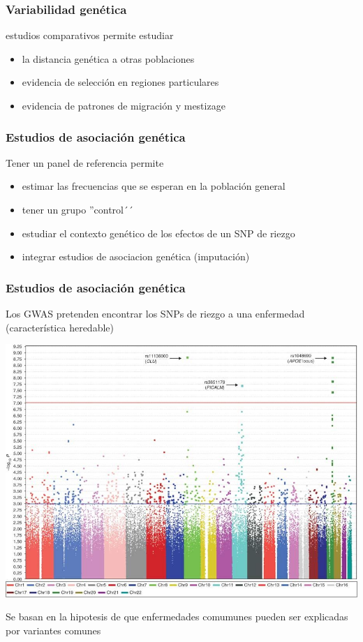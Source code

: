 \documentclass{beamer}\usepackage[]{graphicx}\usepackage[]{color}
\begin{document}
\begin{frame}[fragile]
\frametitle{Variabilidad gen\'etica}
estudios comparativos permite estudiar
\begin{itemize}
\item la distancia gen\'etica a otras poblaciones 
\item evidencia de selecci\'on en regiones particulares
\item evidencia de patrones de migraci\'on y mestizage
\end{itemize}
\end{frame}



\begin{frame}[fragile]
\frametitle{Estudios de asociaci\'on gen\'etica}
Tener un panel de referencia permite
\begin{itemize}
\item estimar las frecuencias que se esperan en la poblaci\'on general 
\item tener un grupo ''control´´
\item estudiar el contexto gen\'etico de los efectos de un SNP de riezgo
\item integrar estudios de asociacion gen\'etica (imputaci\'on)
\end{itemize}
\end{frame}



\begin{frame}[fragile]
\frametitle{Estudios de asociaci\'on gen\'etica}

Los GWAS pretenden encontrar los SNPs de riezgo a una enfermedad (caracter\'istica heredable)

\begin{center}
\includegraphics[width=0.5\linewidth]{alz.jpg}
\end{center}

Se basan en la hipotesis de que enfermedades comumunes pueden ser explicadas por variantes comunes
\end{frame}
\end{document}
